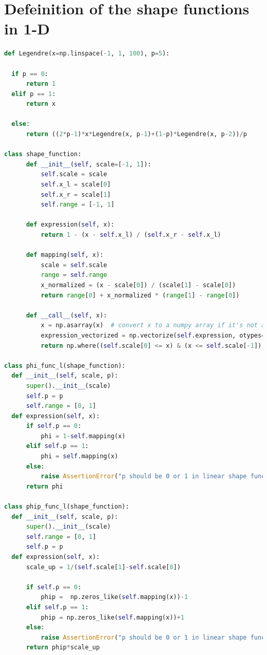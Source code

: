 \documentclass[twoside,twocolumn,10pt]{article}
\begin{document}
\section{Defeinition of the shape functions in 1-D}
\label{Apdx:shape_1D}
\begin{lstlisting}[language=Python, caption=Defeinition of the shape functions in 1-D]
def Legendre(x=np.linspace(-1, 1, 100), p=5):

  if p == 0:
      return 1
  elif p == 1:
      return x

  else:
      return ((2*p-1)*x*Legendre(x, p-1)+(1-p)*Legendre(x, p-2))/p

class shape_function:
      def __init__(self, scale=[-1, 1]):
          self.scale = scale
          self.x_l = scale[0]
          self.x_r = scale[1]
          self.range = [-1, 1]
          
      def expression(self, x):
          return 1 - (x - self.x_l) / (self.x_r - self.x_l)
      
      def mapping(self, x):
          scale = self.scale
          range = self.range
          x_normalized = (x - scale[0]) / (scale[1] - scale[0])
          return range[0] + x_normalized * (range[1] - range[0])
  
      def __call__(self, x):
          x = np.asarray(x)  # convert x to a numpy array if it's not already
          expression_vectorized = np.vectorize(self.expression, otypes=['d'])
          return np.where((self.scale[0] <= x) & (x <= self.scale[-1]), expression_vectorized(x), 0)
      
class phi_func_l(shape_function):
  def __init__(self, scale, p):
      super().__init__(scale)
      self.p = p
      self.range = [0, 1]
  def expression(self, x):
      if self.p == 0:
          phi = 1-self.mapping(x)
      elif self.p == 1:
          phi = self.mapping(x) 
      else:
          raise AssertionError("p should be 0 or 1 in linear shape function, not{}".format(self.p))
      return phi
      
class phip_func_l(shape_function):
  def __init__(self, scale, p):
      super().__init__(scale)
      self.range = [0, 1]
      self.p = p
  def expression(self, x):
      scale_up = 1/(self.scale[1]-self.scale[0]) 
      
      if self.p == 0:
          phip =  np.zeros_like(self.mapping(x))-1
      elif self.p == 1:
          phip = np.zeros_like(self.mapping(x))+1
      else:
          raise AssertionError("p should be 0 or 1 in linear shape function, not{}".format(self.p))
      return phip*scale_up
  

\end{lstlisting}
\end{document}
